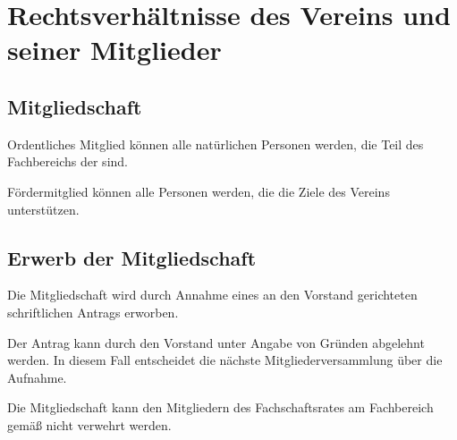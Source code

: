 \chapter{Rechtsverhältnisse des Vereins und seiner Mitglieder}

\section{Mitgliedschaft}\label{sec:mitgliedschaft}
\begin{absätze}
    \item Ordentliches Mitglied können alle natürlichen Personen werden, die Teil des Fachbereichs \Fach{} der \Uni{} sind.
    \item Fördermitglied können alle Personen werden, die die Ziele des Vereins unterstützen.
\end{absätze}

\section{Erwerb der Mitgliedschaft}\label{sec:erwerb_der_mitgliedschaft}
\begin{absätze}
    \item Die Mitgliedschaft wird durch Annahme eines an den Vorstand gerichteten schriftlichen Antrags erworben.
    \item Der Antrag kann durch den Vorstand unter Angabe von Gründen abgelehnt werden. In diesem Fall entscheidet die nächste Mitgliederversammlung über die Aufnahme.
    \item Die Mitgliedschaft kann den Mitgliedern des Fachschaftsrates am Fachbereich \Fach{} gemäß \VerweisFachschaftsrat{} nicht verwehrt werden.
\end{absätze}

